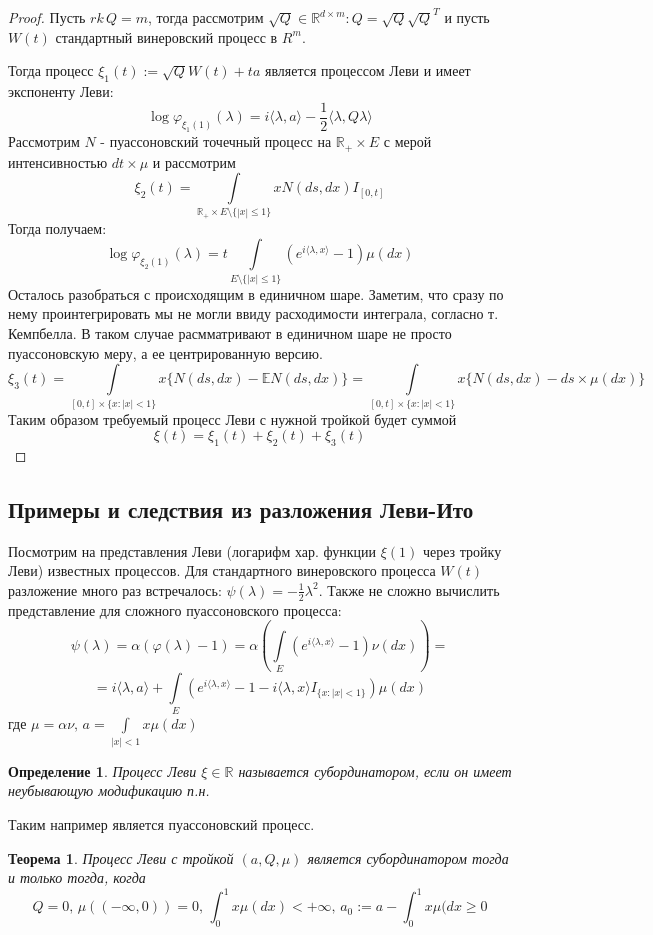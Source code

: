 \documentclass[12pt,a4paper]{article} %
\newtheorem{theorem}{Теорема}
\newtheorem{definition}{Определение}
\newcommand{\R}{\mathbb{R}}
\newcommand{\E}{\mathbb{E}}
\newcommand{\charf}[2][\lambda]{\varphi_{#2}(#1)}
\begin{document}
	\begin{proof}
		Пусть $rk\,Q=m$, тогда рассмотрим $\sqrt{Q}\in\R^{d\times m}:Q=\sqrt{Q}\sqrt{Q}^T$ и пусть $W(t)$ стандартный винеровский процесс в $R^m$.
		
		Тогда процесс $\xi_1(t):=\sqrt{Q}W(t)+ta$ является процессом Леви и имеет экспоненту Леви:
		$$\log\charf{\xi_1(1)}=i\langle\lambda,a\rangle-\frac{1}{2}\langle\lambda,Q\lambda\rangle$$
		Рассмотрим $N$ - пуассоновский точечный процесс на $\R_{+}\times E$ с мерой интенсивностью $dt\times\mu$ и рассмотрим
		$$\xi_2(t)=\int\limits_{\R_{+}\times E\setminus\{|x|\leq1\}}xN(ds,dx)I_{[0,t]}$$
		Тогда получаем:
		$$\log\charf{\xi_2(1)}=t\int\limits_{E\setminus\{|x|\leq1\}}(e^{i\langle\lambda,x\rangle}-1)\mu(dx)$$
		Осталось разобраться с происходящим в единичном шаре. Заметим, что сразу по нему проинтегрировать мы не могли ввиду расходимости интеграла, согласно т. Кемпбелла. В таком случае расмматривают в единичном шаре не просто пуассоновскую меру, а ее центрированную версию.
		$$\xi_3(t)=\int\limits_{[0,t]\times\{x:|x|<1\}}x\{N(ds,dx)-\E N(ds,dx)\}=\int\limits_{[0,t]\times\{x:|x|<1\}}x\{N(ds,dx)-ds\times\mu(dx)\}$$
		Таким образом требуемый процесс Леви с нужной тройкой будет суммой
		$$\xi(t)=\xi_1(t)+\xi_2(t)+\xi_3(t)$$
	\end{proof}
	\subsection{Примеры и следствия из разложения Леви-Ито}
	Посмотрим на представления Леви (логарифм хар. функции $\xi(1)$ через тройку Леви) известных процессов. Для стандартного винеровского процесса $W(t)$ разложение много раз встречалось: $\psi(\lambda)=-\frac{1}{2}\lambda^2$. Также не сложно вычислить представление для сложного пуассоновского процесса:
	$$\psi(\lambda)=\alpha(\varphi(\lambda)-1)=\alpha\left(\int\limits_E(e^{i\langle\lambda,x\rangle}-1)\nu(dx)\right)=$$
	$$=i\langle\lambda,a\rangle+\int\limits_E(e^{i\langle\lambda,x\rangle}-1-i\langle\lambda,x\rangle I_{\{x:|x|<1\}})\mu(dx)$$
	где $\mu=\alpha\nu,\,a=\int\limits_{|x|<1}x\mu(dx)$
	\begin{definition}
		Процесс Леви $\xi\in\R$ называется субординатором, если он имеет неубывающую модификацию п.н.
	\end{definition}
	Таким например является пуассоновский процесс.
	\begin{theorem}
		Процесс Леви с тройкой $(a,Q,\mu)$ является субординатором тогда и только тогда, когда
		$$Q=0,\,\mu((-\infty,0))=0,\,\int_0^1x\mu(dx)<+\infty,\,a_0:=a-\int_0^1x\mu(dx\geq0$$
	\end{theorem}
\end{document}
